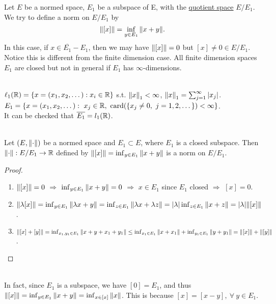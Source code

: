 \vspace{6pt}
\np Let $E$ be a normed space, $E_1$ be a subspace of E, with the \underline{quotient space} $E/ E_1$. We try to define a norm on $E / E_1$ by $$\norm{[x]} = \inf_{y \in E_1} \norm{x + y}.$$
In this case, if $x \in \overline{E_1} - E_1$, then we may have $\norm{[x]} = 0$ but $[x] \neq 0 \in E/E_1$. Notice this is different from the finite dimension case. All finite dimension spaces $E_1$ are closed but not in general if $E_1$ has $\infty$-dimensions. 
\begin{example}\ \\
$\ell_1 (\mathbb{R}) = \{x = (x_1,x_2,\dots): x_i \in \mathbb{R}\}$ s.t. $\norm{x}_1 < \infty$, $\norm{x}_1 = \sum_{j = 1}^\infty \abs{x_j}$.\\ 
$E_1 = \{x = (x_1,x_2,\dots):\ x_j \in \R,\ \text{card}(\{x_j \neq 0,\ j = 1,2,\dots\}) < \infty \}$.\\ 
It can be checked that $\overline{E_1} = l_1(\mathbb{R})$.
\end{example}

\begin{proposition}\ \\
Let $(E, \norm{\cdot})$ be a normed space and $E_1 \subset E$, where $E_1$ is a closed subspace. Then $\norm{\cdot}: E/E_1 \to \mathbb{R}$ defined by $\norm{[x]} = \inf_{y \in E_1} \norm{x+y}$ is a norm on $E/E_1$.
\end{proposition}
\begin{proof}\
    \begin{enumerate}[label = (\alph*)]
        \item $\norm{[x]} = 0$ $\Rightarrow$ $\inf_{y \in E_1} \norm{x + y} = 0$ $\Rightarrow$ $x \in E_1$ since $E_1$ closed $\Rightarrow$ $[x] = 0$.
        \item $\norm{\lambda [x]} = \inf_{y \in E_1} \norm{\lambda x + y} = \inf_{z \in E_1} \norm{\lambda x + \lambda z} = \abs{\lambda} \inf_{z \in E_1} \norm{x +z} = \abs{\lambda} \norm{[x]}$.
        \item $\norm{[x] + [y]} = \inf_{x_1,y_1 \in E_1} \norm{x + y + x_1 + y_1} \leq \inf_{x_1 \in E_1} \norm{x + x_1} + \inf_{y_1 \in E_1} \norm{y + y_1} = \norm{[x]} + \norm{[y]}$.
    \end{enumerate}
\end{proof}

\begin{remark}\ \\
In fact, since $E_1$ is a subspace, we have $[0] = E_1$, and thus $\norm{[x]} = \inf_{y \in E_1} \norm{x + y} = \inf_{x \in [x]} \norm{x}$. This is because $[x] = [x - y],\ \forall\ y \in E_1$.
\end{remark}